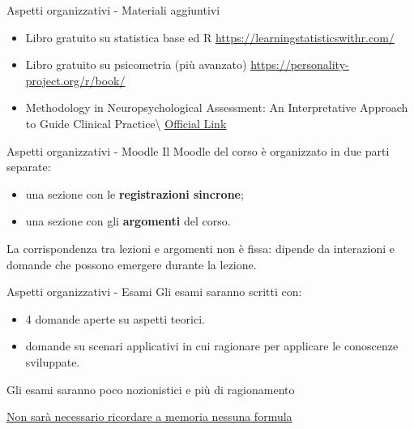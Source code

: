 \documentclass[
  ignorenonframetext,
  aspectratio=169,
]{beamer}
\providecommand{\tightlist}{%
  \setlength{\itemsep}{0pt}\setlength{\parskip}{0pt}}
\begin{document}
\begin{frame}{Aspetti organizzativi - Materiali aggiuntivi}
\label{aspetti-organizzativi---materiali-aggiuntivi}
\begin{itemize}
\item
  Libro gratuito su statistica base ed R
  \href{https://learningstatisticswithr.com/}{\underline{https://learningstatisticswithr.com/}}
\item
  Libro gratuito su psicometria (più avanzato)
  \href{https://personality-project.org/r/book/}{\underline{https://personality-project.org/r/book/}}
\item
  Methodology in Neuropsychological Assessment: An Interpretative
  Approach to Guide Clinical Practice\textbackslash{}
  \href{https://www.routledge.com/Methodology-in-Neuropsychological-Assessment-An-Interpretative-Approach-to-Guide-Clinical-Practice/Mondini-Cappelletti-Arcara/p/book/9781032049298?source=shoppingads&locale=en-EUR&gad_source=1&gad_campaignid=23990380031&gbraid=0AAAAACWuhHVwtsdxPX8pdph-igFJa2sOA&gclid=Cj0KCQjwuJLWBhD_ARIsAIBcRUyKbLgdxacvmxbw6-SJ6mFfJaza7spswGIKbigbDEISDFoE86GrHT0aAoEqEALw_wcB}{\underline{Official Link}}
\end{itemize}
\end{frame}

\begin{frame}{Aspetti organizzativi - Moodle}
\label{aspetti-organizzativi---moodle}
Il Moodle del corso è organizzato in due parti separate:

\begin{itemize}
\tightlist
\item
  una sezione con le \textbf{registrazioni sincrone};
\item
  una sezione con gli \textbf{argomenti} del corso.
\end{itemize}

\vspace{1em}

La corrispondenza tra lezioni e argomenti non è fissa: dipende da
interazioni e domande che possono emergere durante la lezione.
\end{frame}

\begin{frame}{Aspetti organizzativi - Esami}
\label{aspetti-organizzativi---esami}
Gli esami saranno scritti con:

\begin{itemize}
\tightlist
\item
  4 domande aperte su aspetti teorici.
\item
  domande su scenari applicativi in cui ragionare per applicare le
  conoscenze sviluppate.
\end{itemize}

Gli esami saranno poco nozionistici e più di ragionamento

\underline{Non sarà necessario ricordare a memoria nessuna formula}
\end{frame}
\end{document}
